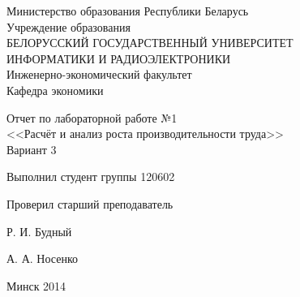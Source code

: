 \thispagestyle{empty}
\setlength{\parindent}{0ex} %

\begin{center}
  Министерство образования Республики Беларусь \\
  \smallskip
  Учреждение образования \\
  БЕЛОРУССКИЙ ГОСУДАРСТВЕННЫЙ УНИВЕРСИТЕТ \\
  ИНФОРМАТИКИ И РАДИОЭЛЕКТРОНИКИ \\
  \smallskip
  Инженерно-экономический факультет \\
  \smallskip
  Кафедра экономики
\end{center}

\vspace{40mm}

\begin{center}
  Отчет по лабораторной работе №1 \\
  <<Расчёт и анализ роста производительности труда>> \\
  Вариант 3
\end{center}

\vspace{60mm}

\begin{minipage}{.55\linewidth}
  Выполнил студент группы 120602

  \smallskip

  Проверил старший преподаватель
\end{minipage}
\hfill
\begin{minipage}{.4\linewidth}
  \begin{flushright}
    Р. И. Будный

    \smallskip

    А. А. Носенко
  \end{flushright}
\end{minipage}

\vspace{55mm}
\begin{center}
  Минск 2014
\end{center}

\setlength{\parindent}{5ex} %
